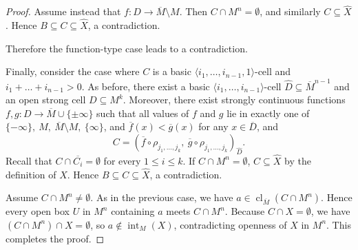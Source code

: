 \documentclass{amsart}
\theoremstyle{definition}
\newtheorem{remark}[definition]{Remark}
\theoremstyle{plain}
\newcommand{\bN}{\mathbb N}
\newcommand{\ov}[1]{\overline{#1}}
\DeclareMathOperator{\Int}{int}
\DeclareMathOperator{\cl}{cl}
\begin{document}
\begin{proof}
	Assume instead that $f:D\to \overline{M}\setminus M$.
	Then $C \cap M^n = \emptyset$, and similarly $C \subseteq \hat{X}$.
	Hence $B \subseteq C \subseteq \hat{X}$, a contradiction.
	
	Therefore the function-type case leads to a contradiction.
	
	Finally, consider the case where $C$ is a basic $\langle i_1,\dots,i_{n-1},1 \rangle$-cell and $i_1+\dots+i_{n-1} > 0$.
	As before, there exist a basic $\langle i_1,\dots,i_{n-1} \rangle$-cell $\hat{D} \subseteq \overline{M}^{n-1}$ and an open strong cell $D \subseteq M^k$.
	Moreover, there exist strongly continuous functions $f,g : D \to \overline{M} \cup \{\pm\infty\}$ such that all values of $f$ and $g$ lie in exactly one of
	$\{-\infty\},\ M,\ \overline{M}\setminus M,\ \{\infty\}$, and
	$\overline{f}(x) < \overline{g}(x)$ for any $x \in \overline{D}$, and
	\[
	C = (\overline{f} \circ \rho_{j_1,\ldots,j_k},\ \overline{g} \circ \rho_{j_1,\ldots,j_k})_{\hat{D}}.
	\]
		Recall that $C \cap \overline{C_i} = \emptyset$ for every $1 \leq i \leq k$.
	If $C \cap M^n = \emptyset$, $C \subseteq \hat{X}$ by the definition of $\hat{X}$.
	Hence $B \subseteq C \subseteq \hat{X}$, a contradiction.
	
	
	Assume $C \cap M^n \ne \emptyset$.
	As in the previous case, we have $a \in \cl_{\overline{M}}(C \cap M^n)$.
	Hence every open box $U$ in $M^n$ containing $a$ meets $C \cap M^n$.
	Because $C \cap X = \emptyset$, we have $(C \cap M^n) \cap X = \emptyset$, so $a \notin \Int_M(X)$, contradicting openness of $X$ in $M^n$.
	This completes the proof.
\end{proof}







\end{document}
